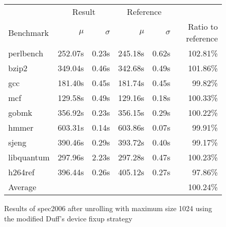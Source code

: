 \begin{figure}[bh]
    \begin{center}
        \begin{tabular}{lrrrrr}
            \toprule
            & \multicolumn{2}{c}{Result} & \multicolumn{2}{c}{Reference}\\
            Benchmark & $\mu$ & $\sigma$ & $\mu$ & $\sigma$ & Ratio to reference\\
            \midrule
            perlbench & 252.07s & 0.23s & 245.18s & 0.62s & 102.81\%\\
            bzip2 & 349.04s & 0.46s & 342.68s & 0.49s & 101.86\%\\
            gcc & 181.40s & 0.45s & 181.74s & 0.45s & 99.82\%\\
            mcf & 129.58s & 0.49s & 129.16s & 0.18s & 100.33\%\\
            gobmk & 356.92s & 0.23s & 356.15s & 0.29s & 100.22\%\\
            hmmer & 603.31s & 0.14s & 603.86s & 0.07s & 99.91\%\\
            sjeng & 390.46s & 0.29s & 393.72s & 0.40s & 99.17\%\\
            libquantum & 297.96s & 2.23s & 297.28s & 0.47s & 100.23\%\\
            h264ref & 396.44s & 0.26s & 405.12s & 0.27s & 97.86\%\\
            \midrule
            Average & & & & & 100.24\%\\
            \bottomrule
        \end{tabular}
    \end{center}
    \caption{Results of spec2006 after unrolling with maximum size 1024 using the modified Duff's device fixup strategy}
    \label{fig:eval:perf:duff:1024}
\end{figure}